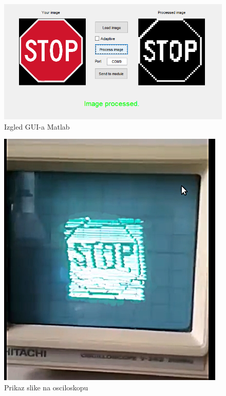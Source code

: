 \documentclass[12pt]{article}
\begin{document}
\begin{figure}[h!]
    \centering
  \includegraphics[scale=0.4]{51216169_2121010267980352_2222276474780516352_n.png}
  \caption{Izgled GUI-a Matlab}
  \label{fig:gui2}
\end{figure}
\begin{figure}[h!]
    \centering
  \includegraphics[scale=0.5]{stopfinal.jpg}
  \caption{Prikaz slike na osciloskopu}
  \label{fig:stop}
\end{figure}
\end{document}
